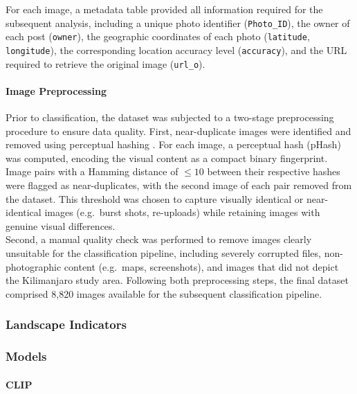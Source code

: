 \documentclass[hidelinks, 11pt]{article}
\begin{document}
For each image, a metadata table provided all information required for the 
subsequent analysis, including a unique photo identifier (\texttt{Photo\_ID}), the owner of each post (\texttt{owner}), the geographic coordinates of each 
photo (\texttt{latitude}, \texttt{longitude}), the corresponding location accuracy level (\texttt{accuracy}), and the URL required to retrieve the 
original image (\texttt{url\_o}).

\paragraph{Image Preprocessing}

Prior to classification, the dataset was subjected to a two-stage preprocessing procedure to ensure data quality. First, near-duplicate images were identified and removed using perceptual hashing \citep{zauner_implementation_nodate}. For each image, a perceptual hash (pHash) was computed, encoding the visual content as a compact binary fingerprint. Image pairs with a Hamming distance of $\leq 10$ between their respective hashes were flagged as near-duplicates, with the second image of each pair removed from the dataset. This threshold was chosen to capture visually identical or near-identical images (e.g.\ burst shots, re-uploads) while retaining images with genuine visual differences.
\\
Second, a manual quality check was performed to remove images clearly unsuitable for the classification pipeline, including severely corrupted files, non-photographic content (e.g.\ maps, screenshots), and images that did not depict the Kilimanjaro study area. Following both preprocessing steps, the final dataset comprised 8{,}820 images available for the subsequent classification 
pipeline.


\subsubsection{Landscape Indicators}


\subsubsection{Models}

\paragraph{CLIP}
\end{document}

